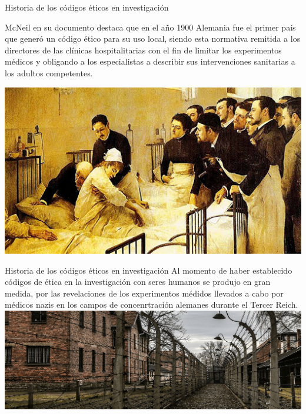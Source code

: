 \begin{frame}{Historia de los códigos éticos en investigación}
    \begin{minipage}{0.5\linewidth}
        McNeil en su documento destaca 
        que en el año 1900 Alemania fue el primer país que generó un código ético para su uso local, siendo esta normativa remitida
        a los directores de las clínicas hospitalitarias con el fin de limitar los experimentos médicos y obligando a los especialistas 
        a describir sus intervenciones sanitarias a los adultos competentes.
    \end{minipage}
    \begin{minipage}{0.45\linewidth}
        \centering
        \includegraphics[scale=0.4]{images/ima5.jpg}
    \end{minipage}
\end{frame}
\begin{frame}{Historia de los códigos éticos en investigación}
        Al momento de haber establecido códigos de ética en la investigación con seres humanos se produjo en gran medida, por las revelaciones de 
        los experimentos médidos llevados a cabo por médicos nazis en los campos de concenrtración alemanes durante el Tercer Reich. \\
        \centering
        \includegraphics[scale=0.27]{images/ima6.png}
\end{frame}
